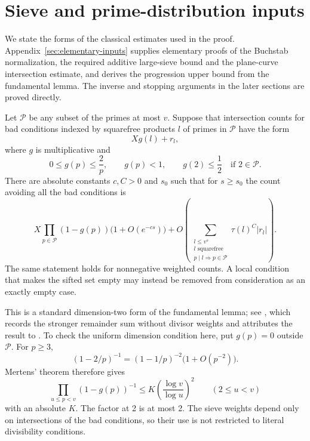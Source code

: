 \section{Sieve and prime-distribution inputs}\label{sec:inputs}

We state the forms of the classical estimates used in the proof.
Appendix~\ref{sec:elementary-inputs} supplies elementary proofs of the
Buchstab normalization, the required additive large-sieve bound and the
plane-curve intersection estimate, and derives the progression upper
bound from the fundamental lemma. The inverse and stopping arguments
in the later sections are proved directly.

\begin{lemma}\label{lem:fundamental}
Let $\mathcal P$ be any subset of the primes at most $v$. Suppose that
intersection counts for bad conditions indexed by squarefree products
$l$ of primes in $\mathcal P$ have the form
\[
 Xg(l)+r_l,
\]
where $g$ is multiplicative and
\[
 0\le g(p)\le\frac2p,\qquad g(p)<1,\qquad g(2)\le\frac12
 \quad\text{if }2\in\mathcal P.
\]
There are absolute constants $c,C>0$ and $s_0$ such that for $s\ge s_0$
the count avoiding all the bad conditions is
\begin{equation}\label{eq:fundamental-input}
 X\prod_{p\in\mathcal P}(1-g(p))\bigl(1+O(e^{-cs})\bigr)
 +O\!\left(
 \sum_{\substack{l\le v^s\\l\text{ squarefree}\\p\mid l\Rightarrow p\in\mathcal P}}
 \tau(l)^C|r_l|\right).
\end{equation}
The same statement holds for nonnegative weighted counts. A local
condition that makes the sifted set empty may instead be removed from
consideration as an exactly empty case.
\end{lemma}

This is a standard dimension-two form of the fundamental lemma; see
\cite[Lemma~2.8, p.~S137]{Sofos2023}, which records the stronger remainder sum
without divisor weights and attributes the result to
\cite[Corollary~6.10]{FriedlanderIwaniec2010}. To check the uniform
dimension condition here, put $g(p)=0$ outside $\mathcal P$. For $p\ge3$,
\[
 (1-2/p)^{-1}=(1-1/p)^{-2}\bigl(1+O(p^{-2})\bigr).
\]
Mertens' theorem therefore gives
\[
 \prod_{u\le p<v}(1-g(p))^{-1}
 \le K\left(\frac{\log v}{\log u}\right)^2
 \qquad(2\le u<v)
\]
with an absolute $K$. The factor at 2 is at most 2. The sieve weights
depend only on intersections of the bad conditions, so their use is
not restricted to literal divisibility conditions.

